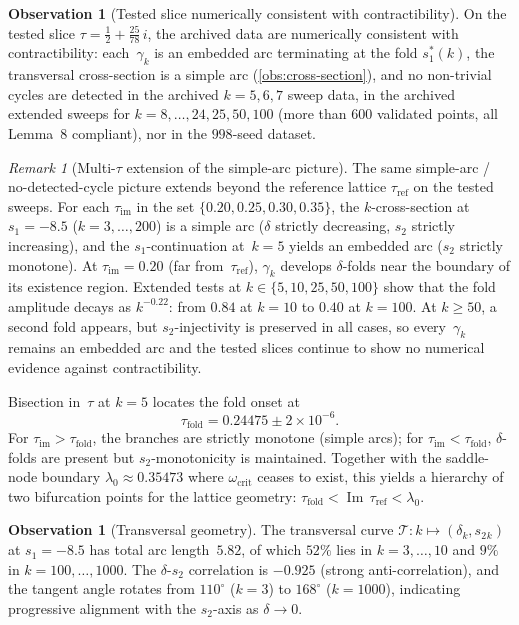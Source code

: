 \documentclass[11pt,a4paper]{article}
\theoremstyle{plain}
\theoremstyle{definition}
\newtheorem{observation}[theorem]{Observation}
\theoremstyle{remark}
\newtheorem{remark}[theorem]{Remark}
\DeclareMathOperator{\Imag}{Im}
\begin{document}
\begin{observation}[Tested slice numerically consistent with
  contractibility]
\label{obs:contractible}
On the tested slice
$\tau = \tfrac12 + \tfrac{25}{78}\,i$, the archived data are
numerically consistent with contractibility:
each~$\gamma_k$ is an embedded arc terminating at the fold
$s_1^*(k)$, the transversal cross-section is a simple arc
(\cref{obs:cross-section}), and no non-trivial cycles are
detected in the archived $k=5,6,7$ sweep data, in the
archived extended sweeps for $k = 8,\ldots,24,25,50,100$
(more than $600$ validated points, all Lemma~8 compliant), nor in the
$998$-seed dataset.
\end{observation}

\begin{remark}[Multi-$\tau$ extension of the simple-arc picture]
\label{rem:multi-tau-contractibility}
The same simple-arc / no-detected-cycle picture extends beyond the
reference lattice $\tau_{\mathrm{ref}}$ on the tested sweeps.
For each $\tau_{\mathrm{im}}$ in the set
$\{0.20, 0.25, 0.30, 0.35\}$,
the $k$-cross-section at $s_1 = -8.5$
($k = 3, \ldots, 200$) is a simple arc
($\delta$ strictly decreasing, $s_2$ strictly increasing),
and the $s_1$-continuation at~$k=5$ yields an embedded arc
($s_2$ strictly monotone).
At $\tau_{\mathrm{im}} = 0.20$ (far from~$\tau_{\mathrm{ref}}$),
$\gamma_{k}$ develops $\delta$-folds near the boundary of its
existence region.  Extended tests at
$k \in \{5, 10, 25, 50, 100\}$ show that the fold amplitude
decays as $k^{-0.22}$: from $0.84$ at $k=10$ to $0.40$ at
$k=100$.  At $k \geq 50$, a second fold appears, but
$s_2$-injectivity is preserved in all cases, so
every~$\gamma_k$ remains an embedded arc and the tested slices continue
to show no numerical evidence against contractibility.

Bisection in~$\tau$ at $k = 5$ locates the fold onset at
\[
  \tau_{\mathrm{fold}} = 0.24475 \pm 2 \times 10^{-6}.
\]
For $\tau_{\mathrm{im}} > \tau_{\mathrm{fold}}$,
the branches are strictly monotone (simple arcs); for
$\tau_{\mathrm{im}} < \tau_{\mathrm{fold}}$,
$\delta$-folds are present but $s_2$-monotonicity is
maintained.
Together with the saddle-node boundary
$\lambda_0 \approx 0.35473$ where
$\omega_{\mathrm{crit}}$ ceases to exist, this yields a
hierarchy of two bifurcation points for the lattice
geometry:
$\tau_{\mathrm{fold}} < \Imag\,\tau_{\mathrm{ref}} < \lambda_0$.
\end{remark}

\begin{observation}[Transversal geometry]
\label{obs:transversal}
The transversal curve $\mathcal{T}\colon k \mapsto
(\delta_k, s_2{}_k)$ at $s_1 = -8.5$ has total arc
length~$5.82$, of which $52\%$ lies in $k = 3,\ldots,10$
and $9\%$ in $k = 100,\ldots,1000$.  The $\delta$-$s_2$
correlation is $-0.925$ (strong anti-correlation), and
the tangent angle rotates from $110^\circ$ ($k=3$)
to $168^\circ$ ($k=1000$), indicating progressive
alignment with the $s_2$-axis as $\delta \to 0$.
\end{observation}
\end{document}
